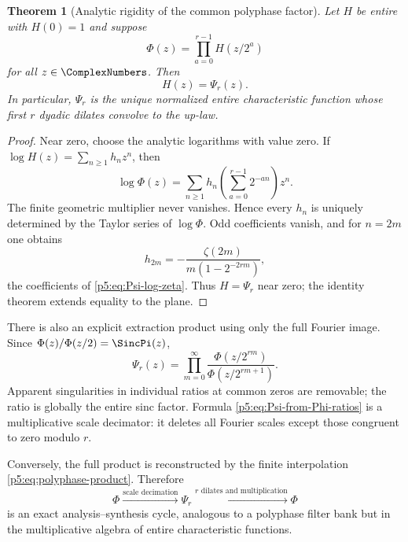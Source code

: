 \documentclass[11pt]{article}
\newtheorem{theorem}{Theorem}[section]
\theoremstyle{definition}
\theoremstyle{remark}
\begin{document}
\begin{theorem}[Analytic rigidity of the common polyphase factor]
\label{p5:thm:polyphase-rigidity}
Let $H$ be entire with $H(0)=1$ and suppose
\begin{equation}
 \Phi(z)=\prod_{a=0}^{r-1}H(z/2^a)                         \label{p5:eq:H-factor-assumption}
\end{equation}
for all $z\in\ComplexNumbers$.  Then
\begin{equation}
 H(z)=\Psi_r(z).                                           \label{p5:eq:H-equals-Psi}
\end{equation}
In particular, $\Psi_r$ is the unique normalized entire characteristic
function whose first $r$ dyadic dilates convolve to the up-law.
\end{theorem}

\begin{proof}
Near zero, choose the analytic logarithms with value zero.  If
$\log H(z)=\sum_{n\ge1}h_nz^n$, then
\[
 \log\Phi(z)=\sum_{n\ge1}h_n
 \left(\sum_{a=0}^{r-1}2^{-an}\right)z^n.
\]
The finite geometric multiplier never vanishes.  Hence every $h_n$ is uniquely
determined by the Taylor series of $\log\Phi$.  Odd coefficients vanish, and
for $n=2m$ one obtains
\[
 h_{2m}=-\frac{\zeta(2m)}{m(1-2^{-2rm})},
\]
the coefficients of \eqref{p5:eq:Psi-log-zeta}.  Thus $H=\Psi_r$ near zero;
the identity theorem extends equality to the plane.
\end{proof}

There is also an explicit extraction product using only the full Fourier image.
Since $\Phi(z)/\Phi(z/2)=\SincPi(z)$,
\begin{equation}
 \boxed{\displaystyle
 \Psi_r(z)=\prod_{m=0}^{\infty}
 \frac{\Phi(z/2^{rm})}{\Phi(z/2^{rm+1})}.}                \label{p5:eq:Psi-from-Phi-ratios}
\end{equation}
Apparent singularities in individual ratios at common zeros are removable;
the ratio is globally the entire sinc factor.  Formula
\eqref{p5:eq:Psi-from-Phi-ratios} is a multiplicative scale decimator: it deletes
all Fourier scales except those congruent to zero modulo $r$.

Conversely, the full product is reconstructed by the finite interpolation
\eqref{p5:eq:polyphase-product}.  Therefore
\begin{equation}
 \Phi
 \xrightarrow{\text{scale decimation}}\Psi_r
 \xrightarrow{\text{$r$ dilates and multiplication}}\Phi                 \label{p5:eq:analysis-synthesis-cycle}
\end{equation}
is an exact analysis--synthesis cycle, analogous to a polyphase filter bank but
in the multiplicative algebra of entire characteristic functions.
\end{document}
